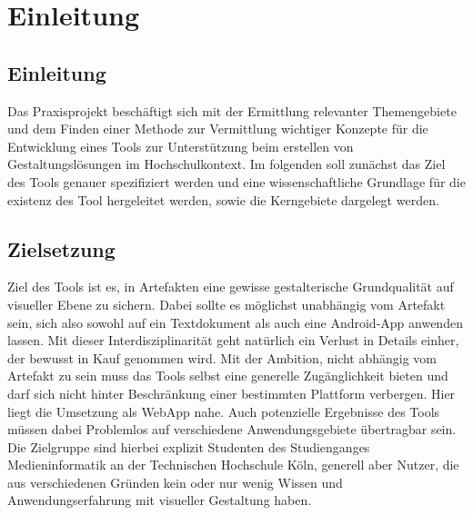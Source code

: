 

\newcommand{\chaptertitle}{Einleitung}

\chapter{\chaptertitle} %

\label{Einleitung} %

\lhead{\chaptername{} \thechapter{} - \emph{\chaptertitle}} %


\section{Einleitung}
Das Praxisprojekt beschäftigt sich mit der Ermittlung relevanter Themengebiete und dem 
Finden einer Methode zur Vermittlung wichtiger Konzepte für die Entwicklung eines Tools 
zur Unterstützung beim erstellen von Gestaltungslösungen im Hochschulkontext. 
Im folgenden soll zunächst das Ziel des Tools genauer spezifiziert werden und eine wissenschaftliche Grundlage für die existenz des Tool hergeleitet werden, sowie die Kerngebiete dargelegt werden.


\section{Zielsetzung}
Ziel des Tools ist es, in Artefakten eine gewisse gestalterische Grundqualität auf visueller Ebene zu sichern. Dabei sollte es möglichst unabhängig vom Artefakt sein, sich also sowohl auf ein Textdokument als auch eine Android-App anwenden lassen. Mit dieser Interdisziplinarität geht natürlich ein Verlust in Details einher, der bewusst in Kauf genommen wird.
Mit der Ambition, nicht abhängig vom Artefakt zu sein muss das Tools selbst eine generelle Zugänglichkeit bieten und darf sich nicht hinter Beschränkung einer bestimmten Plattform verbergen. Hier liegt die Umsetzung als WebApp nahe. Auch potenzielle Ergebnisse des Tools müssen dabei Problemlos auf verschiedene Anwendungsgebiete übertragbar sein.
Die Zielgruppe sind hierbei explizit Studenten des Studienganges Medieninformatik an der Technischen Hochschule Köln, generell aber Nutzer, die aus verschiedenen Gründen kein oder nur wenig Wissen und Anwendungserfahrung mit visueller Gestaltung haben.

